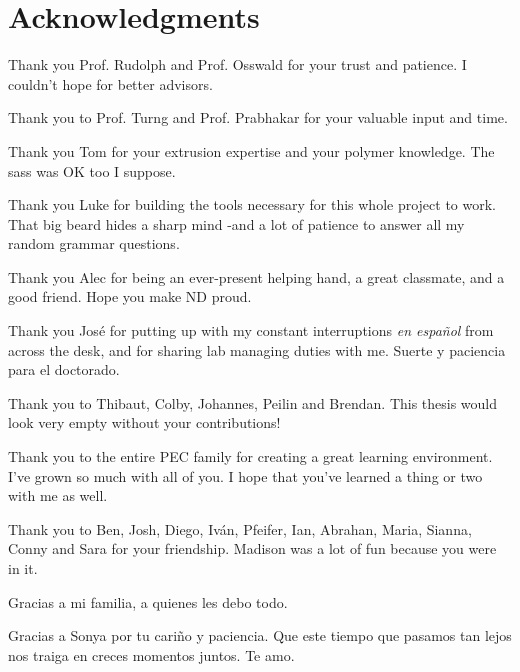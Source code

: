 \documentclass[main.tex]{subfiles}
\begin{document}
\chapter*{Acknowledgments}
{
\setlength{\parindent}{0cm}
\setlength{\parskip}{12pt}
Thank you Prof. Rudolph and Prof. Osswald for your trust and patience. I couldn't hope for better advisors.

Thank you to Prof. Turng and Prof. Prabhakar for your valuable input and time. 
     
Thank you Tom for your extrusion expertise and your polymer knowledge. The sass was OK too I suppose.

Thank you Luke for building the tools necessary for this whole project to work. That big beard hides a sharp mind -and a lot of patience to answer all my random grammar questions.

Thank you Alec for being an ever-present helping hand, a great classmate, and a good friend. Hope you make ND proud.

Thank you Jos\'e for putting up with my constant interruptions \emph{en espa\~nol} from across the desk, and for sharing lab managing duties with me. Suerte y paciencia para el doctorado. 

Thank you to Thibaut, Colby, Johannes, Peilin and Brendan. This thesis would look very empty without your contributions!
    
Thank you to the entire PEC family for creating a great learning environment. I've grown so much with all of you. I hope that you've learned a thing or two with me as well.

Thank you to Ben, Josh, Diego, Iv\'an, Pfeifer, Ian, Abrahan, Maria, Sianna, Conny and Sara for your friendship. Madison was a lot of fun because you were in it.

Gracias a mi familia, a quienes les debo todo. 

Gracias a Sonya por tu cari\~no y paciencia. Que este tiempo que pasamos tan lejos nos traiga en creces momentos juntos. Te amo.  
}
\end{document}
